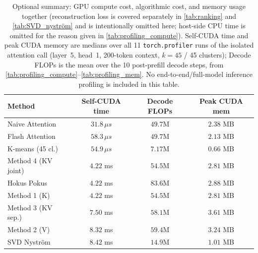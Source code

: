 \begin{table}[ht]
\centering
\small
\caption{Optional summary: GPU compute cost, algorithmic cost, and memory usage together
(reconstruction loss is covered separately in \autoref{tab:ranking} and
\autoref{tab:SVD_nyström} and is intentionally omitted here; host-side CPU time is omitted for
the reason given in \autoref{tab:profiling_compute}). Self-CUDA time and peak CUDA memory are
medians over all 11 \texttt{torch.profiler} runs of the isolated attention call (layer~5,
head~1, 200-token context, $k=45$ / 45 clusters); Decode FLOPs is the mean over the 10
post-prefill decode steps, from \autoref{tab:profiling_compute}--\autoref{tab:profiling_mem}.
No end-to-end/full-model inference profiling is included in this table.}
\label{tab:tradeoff}
\begin{tabular}{l c c c}
\toprule
Method & Self-CUDA time & Decode FLOPs & Peak CUDA mem \\
\midrule
Naive Attention      & $31.8\,\mu s$ & $49.7$M & $2.38$ MB \\
Flash Attention      & $58.3\,\mu s$ & $49.7$M & $2.13$ MB \\
K-means (45 cl.)     & $54.9\,\mu s$ & $7.17$M & $0.66$ MB \\
Method 4 (KV joint)  & $4.22$ ms     & $54.5$M & $2.81$ MB \\
Hokus Pokus          & $4.22$ ms     & $83.6$M & $2.88$ MB \\
Method 1 (K)         & $4.22$ ms     & $54.5$M & $2.81$ MB \\
Method 3 (KV sep.)   & $7.50$ ms     & $58.1$M & $3.61$ MB \\
Method 2 (V)         & $8.32$ ms     & $59.4$M & $3.24$ MB \\
SVD Nyström          & $8.42$ ms     & $14.9$M & $1.01$ MB \\
\bottomrule
\end{tabular}
\end{table}

